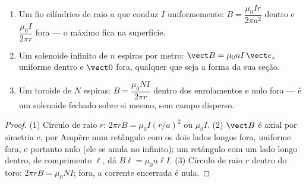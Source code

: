 \begin{proposition}\label{prop:b1:magnetostatics:ampereapps}
\begin{enumerate}
  \item Um fio cilíndrico de raio $a$ que conduz $I$ uniformemente:
        $B = \dfrac{\mu_0Ir}{2\pi a^2}$ dentro e $\dfrac{\mu_0I}{2\pi r}$ fora
        --- o máximo fica na superfície.
  \item Um solenoide infinito de $n$ espiras por metro: $\vect B = \mu_0nI\,
        \vect e_z$ uniforme dentro e $\vect 0$ fora, qualquer que seja a forma da
        sua seção.
  \item Um toroide de $N$ espiras: $B = \dfrac{\mu_0NI}{2\pi r}$ dentro dos
        enrolamentos e nulo fora --- é um solenoide fechado sobre si mesmo, sem
        campo disperso.
\end{enumerate}
\end{proposition}

\begin{proof}
(1) Círculo de raio $r$: $2\pi rB = \mu_0I(r/a)^2$ ou $\mu_0I$. (2) $\vect B$
é axial por simetria e, por Ampère num retângulo com os dois lados longos
fora, uniforme fora, e portanto nulo (ele se anula no infinito); um
retângulo com um lado longo dentro, de comprimento $\ell$, dá $B\ell =
\mu_0n\ell I$. (3) Círculo de raio $r$ dentro do toro: $2\pi rB =
\mu_0NI$; fora, a corrente encerrada é nula.
\end{proof}

